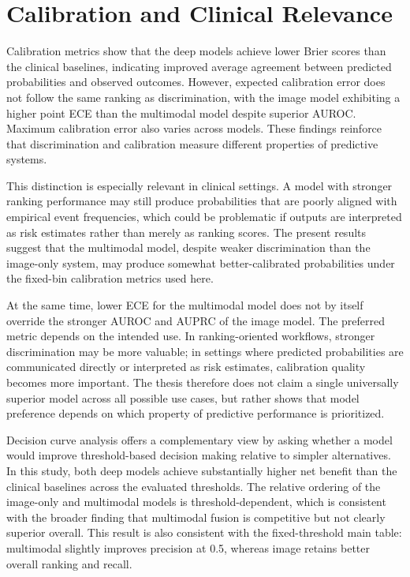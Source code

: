 \section{Calibration and Clinical Relevance}

Calibration metrics show that the deep models achieve lower Brier scores than the clinical baselines, indicating improved average agreement between predicted probabilities and observed outcomes. However, expected calibration error does not follow the same ranking as discrimination, with the image model exhibiting a higher point ECE than the multimodal model despite superior AUROC. Maximum calibration error also varies across models. These findings reinforce that discrimination and calibration measure different properties of predictive systems.

This distinction is especially relevant in clinical settings. A model with stronger ranking performance may still produce probabilities that are poorly aligned with empirical event frequencies, which could be problematic if outputs are interpreted as risk estimates rather than merely as ranking scores. The present results suggest that the multimodal model, despite weaker discrimination than the image-only system, may produce somewhat better-calibrated probabilities under the fixed-bin calibration metrics used here.

At the same time, lower ECE for the multimodal model does not by itself override the stronger AUROC and AUPRC of the image model. The preferred metric depends on the intended use. In ranking-oriented workflows, stronger discrimination may be more valuable; in settings where predicted probabilities are communicated directly or interpreted as risk estimates, calibration quality becomes more important. The thesis therefore does not claim a single universally superior model across all possible use cases, but rather shows that model preference depends on which property of predictive performance is prioritized.

Decision curve analysis offers a complementary view by asking whether a model would improve threshold-based decision making relative to simpler alternatives. In this study, both deep models achieve substantially higher net benefit than the clinical baselines across the evaluated thresholds. The relative ordering of the image-only and multimodal models is threshold-dependent, which is consistent with the broader finding that multimodal fusion is competitive but not clearly superior overall. This result is also consistent with the fixed-threshold main table: multimodal slightly improves precision at 0.5, whereas image retains better overall ranking and recall.

